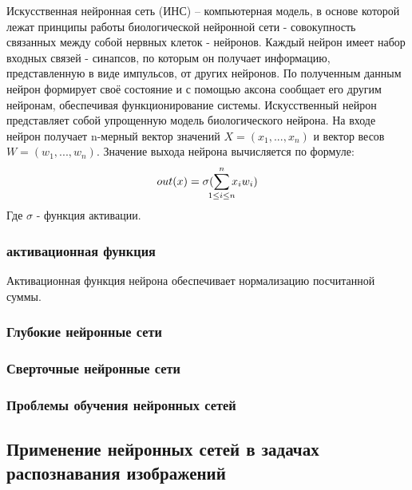 Искусственная нейронная сеть (ИНС) – компьютерная модель, в основе которой лежат принципы работы биологической нейронной сети - совокупность связанных между собой нервных клеток - нейронов. Каждый нейрон имеет набор входных связей - синапсов, по которым он получает информацию, представленную в виде импульсов, от других нейронов. По полученным данным нейрон формирует своё состояние и с помощью аксона сообщает его другим нейронам, обеспечивая функционирование системы. 
Искусственный нейрон представляет собой упрощенную модель биологического нейрона. На входе нейрон получает n-мерный вектор значений \(X=(x_{1},...,x_{n})\) и вектор весов \(W=(w_{1},...,w_{n})\). Значение выхода нейрона вычисляется по формуле: 
\[
  out(x)=\sigma(\sum_{\mathclap{1\le i\le n}}^{n} x_{i}w_{i})
\]
Где \(\sigma\) - функция активации.

\subsubsection{активационная функция}
Активационная функция нейрона обеспечивает нормализацию посчитанной суммы. 
\subsubsection{Глубокие нейронные сети}

\subsubsection{Сверточные нейронные сети}

\subsubsection{Проблемы обучения нейронных сетей}

\subsection{Применение нейронных сетей в задачах распознавания изображений}

\clearpage